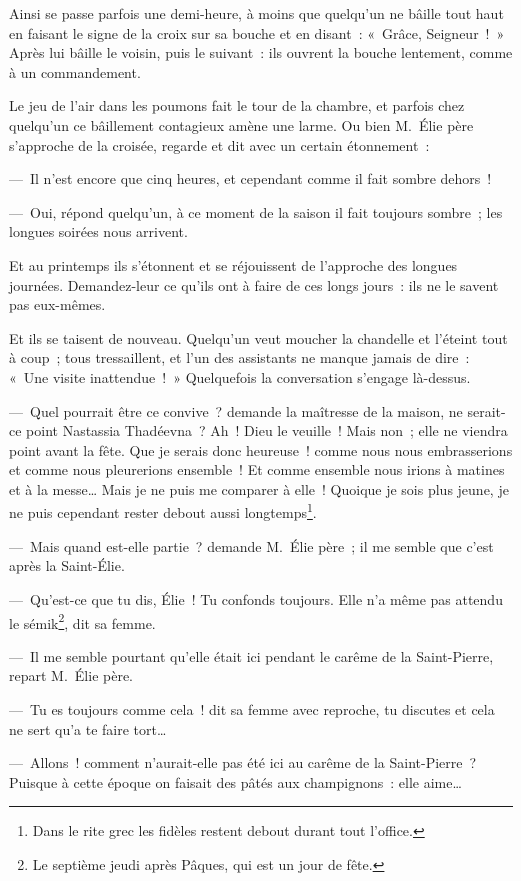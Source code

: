 \documentclass[french,twoside]{book} %
\begin{document}
Ainsi se passe parfois une demi-heure, à moins que quelqu’un ne bâille tout haut en faisant le signe de la croix sur sa bouche et en disant : « Grâce, Seigneur ! » Après lui bâille le voisin, puis le suivant : ils ouvrent la bouche lentement, comme à un commandement.\par
Le jeu de l’air dans les poumons fait le tour de la chambre, et parfois chez quelqu’un ce bâillement contagieux amène une larme. Ou bien M. Élie père s’approche de la croisée, regarde et dit avec un certain étonnement :\par
— Il n’est encore que cinq heures, et cependant comme il fait sombre dehors !\par
— Oui, répond quelqu’un, à ce moment de la saison il fait toujours sombre ; les longues soirées nous arrivent.\par
Et au printemps ils s’étonnent et se réjouissent de l’approche des longues journées. Demandez-leur ce qu’ils ont à faire de ces longs jours : ils ne le savent pas eux-mêmes.\par
Et ils se taisent de nouveau. Quelqu’un veut moucher la chandelle et l’éteint tout à coup ; tous tressaillent, et l’un des assistants ne manque jamais de dire : « Une visite inattendue ! » Quelquefois la conversation s’engage là-dessus.\par
— Quel pourrait être ce convive ? demande la maîtresse de la maison, ne serait-ce point Nastassia Thadéevna ? Ah ! Dieu le veuille ! Mais non ; elle ne viendra point avant la fête. Que je serais donc heureuse ! comme nous nous embrasserions et comme nous pleurerions ensemble ! Et comme ensemble nous irions à matines et à la messe… Mais je ne puis me comparer à elle ! Quoique je sois plus jeune, je ne puis cependant rester debout aussi longtemps\footnote{Dans le rite grec les fidèles restent debout durant tout l’office.}.\par
— Mais quand est-elle partie ? demande M. Élie père ; il me semble que c’est après la Saint-Élie.\par
— Qu’est-ce que tu dis, Élie ! Tu confonds toujours. Elle n’a même pas attendu le sémik\footnote{Le septième jeudi après Pâques, qui est un jour de fête.}, dit sa femme.\par
— Il me semble pourtant qu’elle était ici pendant le carême de la Saint-Pierre, repart M. Élie père.\par
— Tu es toujours comme cela ! dit sa femme avec reproche, tu discutes et cela ne sert qu’a te faire tort…\par
— Allons ! comment n’aurait-elle pas été ici au carême de la Saint-Pierre ? Puisque à cette époque on faisait des pâtés aux champignons : elle aime…\par
\end{document}
